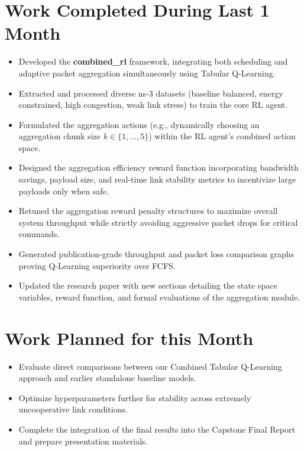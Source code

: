 \documentclass[12pt,a4paper]{article}
\begin{document}
\section{Work Completed During Last 1 Month}
\begin{itemize}[leftmargin=*]
    \item Developed the \textbf{combined\_rl} framework, integrating both scheduling and adaptive packet aggregation simultaneously using Tabular Q-Learning.
    \item Extracted and processed diverse ns-3 datasets (baseline balanced, energy constrained, high congestion, weak link stress) to train the core RL agent.
    \item Formulated the aggregation actions (e.g., dynamically choosing an aggregation chunk size $k \in \{1,\dots,5\}$) within the RL agent's combined action space.
    \item Designed the aggregation efficiency reward function incorporating bandwidth savings, payload size, and real-time link stability metrics to incentivize large payloads only when safe.
    \item Retuned the aggregation reward penalty structures to maximize overall system throughput while strictly avoiding aggressive packet drops for critical commands.
    \item Generated publication-grade throughput and packet loss comparison graphs proving Q-Learning superiority over FCFS.
    \item Updated the research paper with new sections detailing the state space variables, reward function, and formal evaluations of the aggregation module.
\end{itemize}

\section{Work Planned for this Month}
\begin{itemize}[leftmargin=*]
    \item Evaluate direct comparisons between our Combined Tabular Q-Learning approach and earlier standalone baseline models.
    \item Optimize hyperparameters further for stability across extremely uncooperative link conditions.
    \item Complete the integration of the final results into the Capstone Final Report and prepare presentation materials.
\end{itemize}
\end{document}
